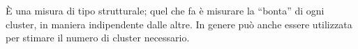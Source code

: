 \documentclass{subfiles}
\begin{document}
\`E una misura di tipo strutturale; quel che fa è misurare la ``bonta'' di ogni cluster, in maniera indipendente dalle altre.
In genere può anche essere utilizzata per stimare il numero di cluster necessario.
\end{document}
